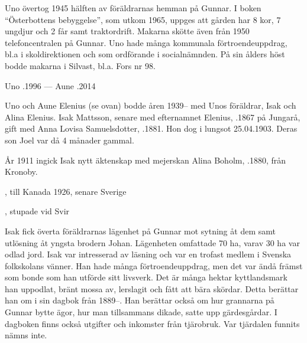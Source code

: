 Uno övertog 1945 hälften av föräldrarnas hemman på Gunnar. I boken ``Österbottens bebyggelse'', som utkom 1965, uppges att gården har 8 kor, 7 ungdjur och 2 får samt traktordrift. Makarna skötte även från 1950 telefoncentralen på Gunnar. Uno hade många kommunala förtroendeuppdrag, bl.a i skoldirektionen och som ordförande i socialnämnden. På sin ålders höst bodde makarna i Silvast, bl.a. Fors nr 98.

Uno .1996  ---  Aune .2014



Uno och Aune Elenius (se ovan) bodde åren 1939-- med Unos föräldrar, Isak och Alina Elenius. Isak Mattsson, senare med efternamnet Elenius, .1867 på Jungarå, gift med Anna Lovisa Samuelsdotter, .1881. Hon dog i lungsot 25.04.1903. Deras son Joel var då 4 månader gammal.

År 1911 ingick Isak nytt äktenskap med mejerskan Alina Boholm, .1880, från Kronoby.
\begin{jhchildren}
  \item {}, till Kanada 1926, senare Sverige
  \item {}
  \item {}
  \item {}
  \item {}, stupade vid Svir
  \item {}
\end{jhchildren}

Isak fick överta föräldrarnas lägenhet på Gunnar mot sytning åt dem samt utlösning åt yngsta brodern Johan. Lägenheten omfattade 70 ha, varav 30 ha var odlad jord. Isak var intresserad av läsning och var en trofast medlem i Svenska folkskolans vänner. Han hade många förtroendeuppdrag, men det var ändå främst som bonde som han utförde sitt livsverk. Det är många hektar kyttlandsmark han uppodlat, bränt mossa av, lerslagit och fått att bära skördar. Detta berättar han om i sin dagbok från 1889--. Han berättar också om  hur grannarna på Gunnar bytte ägor, hur man tillsammans dikade, satte upp gärdesgårdar. I dagboken finns också utgifter och inkomster från tjärobruk. Var tjärdalen funnits nämns	inte.

